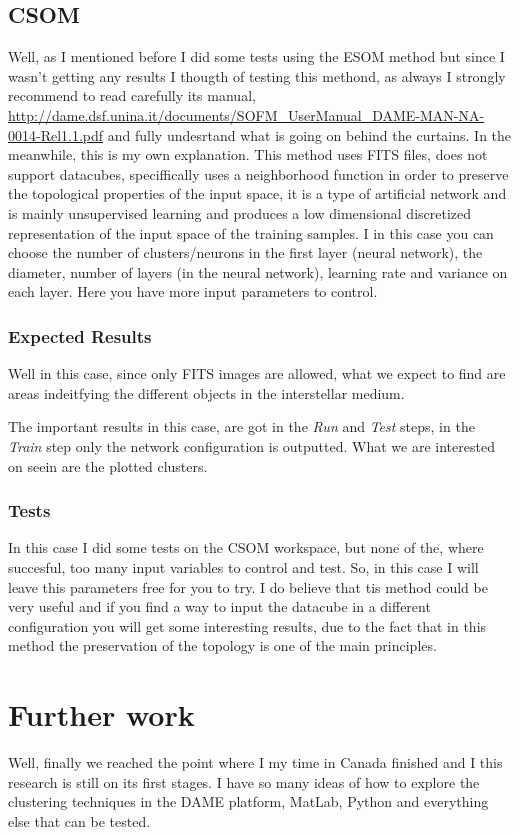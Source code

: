 \documentclass[11pt,fleqn]{book} %
\begin{document}
\subsection{CSOM}
Well, as I mentioned before I did some tests using the ESOM method but since I wasn't getting any results I thougth of testing this methond, as always I strongly recommend to read carefully its manual, \url{http://dame.dsf.unina.it/documents/SOFM_UserManual_DAME-MAN-NA-0014-Rel1.1.pdf} and fully undesrtand what is going on behind the curtains. In the meanwhile, this is my own explanation. This method uses FITS files, does not support datacubes, speciffically uses a neighborhood function in order to preserve the topological properties of the input space, it is a type of artificial network and is mainly unsupervised learning  and produces a low dimensional discretized representation of the input space of the training samples. I in this case you can choose the number of clusters/neurons in the first layer (neural network), the diameter, number of layers (in the neural network), learning rate and variance  on each layer. Here you have more input parameters to control.
\subsubsection{Expected Results}
Well in this case, since only FITS images are allowed, what we expect to find are areas indeitfying the different objects in the interstellar medium.

The important results in this case, are got in the \emph{Run} and \emph{Test} steps, in the \emph{Train} step only the network configuration is outputted. What we are interested on seein are the plotted clusters.
\subsubsection{Tests}
In this case I did some tests on the CSOM workspace, but none of the, where succesful, too many input variables to control and test. So, in this case I will leave this parameters free for you to try. I do believe that tis method could be very useful and if you find a way to input the datacube in a different configuration you will get some interesting results, due to the fact that in this method the preservation of the topology is one of the main principles.


\section{Further work}
Well, finally we reached the point where I my time in Canada finished and I this research is still on its first stages. I have so many ideas of how to explore the clustering techniques in the DAME platform, MatLab, Python and everything else that can be tested. 
\end{document}

